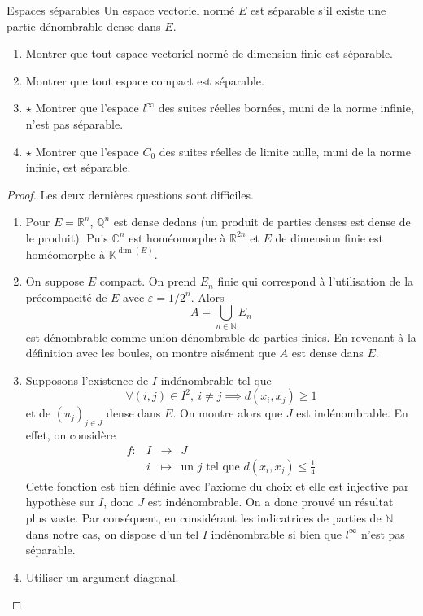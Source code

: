 \documentclass[french,a4paper]{article}
\newcommand{\N}{\mathbb{N}}
\newcommand{\Q}{\mathbb{Q}}
\newcommand{\R}{\mathbb{R}}
\newcommand{\C}{\mathbb{C}}
\newcommand{\K}{\mathbb{K}}
\theoremstyle{plain}
\theoremstyle{definition}
\theoremstyle{remark}
\begin{document}
\begin{ex}{Espaces séparables}
	Un espace vectoriel normé $E$ est séparable s'il existe une partie dénombrable dense dans $E$.
	\begin{enumerate}
		\item Montrer que tout espace vectoriel normé de dimension finie est séparable.
		\item Montrer que tout espace compact est séparable.
		\item  $\star$ Montrer que l'espace $l^\infty$ des suites réelles bornées, muni de la norme infinie, n'est pas séparable.
		\item $\star$ Montrer que l'espace $C_0$ des suites réelles de limite nulle, muni de la norme infinie, est séparable.		
	\end{enumerate}
\end{ex}
\begin{proof}
	Les deux dernières questions sont difficiles.
	\begin{enumerate}
		\item Pour $E=\R^n$, $\Q^n$ est dense dedans (un produit de parties denses est dense de le produit). Puis $\C^n$ est homéomorphe à $\R^{2n}$ et $E$ de dimension finie est homéomorphe à $\K^{\dim(E)}$.
		\item On suppose $E$ compact. On prend $E_n$ finie qui correspond à l'utilisation de la précompacité de $E$ avec $\varepsilon=1/2^n$. Alors $$A=\bigcup_{n\in\N} E_n$$ est dénombrable comme union dénombrable de parties finies. En revenant à la définition avec les boules, on montre aisément que $A$ est dense dans $E$.
		\item Supposons l'existence de $I$ indénombrable tel que $$\forall (i,j)\in I^2,\ i\ne j\implies d(x_i,x_j)\geqslant 1$$ et de $(u_j)_{j\in J}$ dense dans $E$. On montre alors que $J$ est indénombrable. En effet, on considère $$\begin{array}{lrcl}
			f:&I&\longrightarrow&J\\
			&i&\longmapsto&\text{un }j\text{ tel que }d(x_i,x_j)\leqslant\frac{1}{4}
		\end{array}$$ Cette fonction est bien définie avec l'axiome du choix et elle est injective par hypothèse sur $I$, donc $J$ est indénombrable. On a donc prouvé un résultat plus vaste. Par conséquent, en considérant les indicatrices de parties de $\N$ dans notre cas, on dispose d'un tel $I$ indénombrable si bien que $l^\infty$ n'est pas séparable.
		\item Utiliser un argument diagonal.
	\end{enumerate}
\end{proof}
\end{document}
